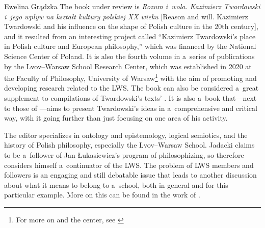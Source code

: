 \begin{newrevengenv}{Ewelina Grądzka}
The book under review is \textit{Rozum i~wola. Kazimierz Twardowski i~jego wpływ na kształt kultury polskiej XX wieku} [Reason and will. Kazimierz Twardowski and his influence on the shape of Polish culture in the 20th century], and it resulted from an interesting project called ``Kazimierz Twardowski's place in Polish culture and European philosophy,'' which was financed by the National Science Center of Poland. It is also the fourth volume in a~series of publications
\parencites[cf.][]{brozek_analiza_2020}{brozek_anti-irrationalism_2020}{jadacki_stanislaw_2020}
by the Lvov–Warsaw School Research Center, which was established in 2020 at the Faculty of Philosophy, University of Warsaw\footnote{For more on \parencite{brozek_analiza_2020} and the center, see \parencites{gradzka_putting_2021}{gradzka_report_2021}}
with the aim of promoting and developing research related to the LWS. The book can also be considered a~great supplement to compilations of Twardowski's texts'
\parencites{twardowski_rozprawy_1927}{decewicz_wybor_1992}{twardowski_mysl_2013}{twardowski_mysl_2014}{brandl_actions_1999}{brozek_anti-irrationalism_2020}.
It is also a~book that---next to those of
\parencites{jadczak_czlowiek_1993}{kleszcz_metoda_2013}[and][]{brozek_kazimierz_2015}---aims to present Twardowski's ideas in a~comprehensive and critical way, with it going further than just focusing on one area of his activity.


The editor specializes in ontology and epistemology, logical semiotics, and the history of Polish philosophy, especially the Lvov–Warsaw School. Jadacki claims to be a~follower of Jan Łukasiewicz's program of philosophizing, so therefore considers himself a~continuator of the LWS. The problem of LWS members and followers is an engaging and still debatable issue that leads to another discussion about what it means to belong to a~school, both in general and for this particular example. More on this can be found in the work of
\parencite{wolenski_filozoficzna_1985}.


\end{newrevengenv}
